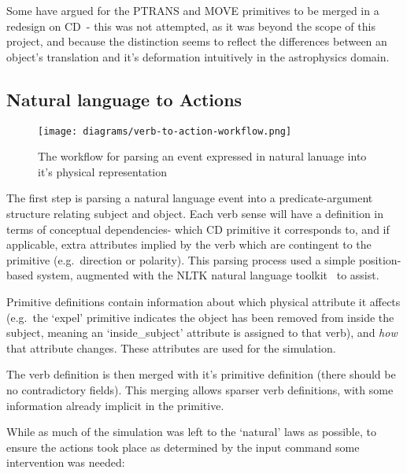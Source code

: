 \documentclass[dissertation.tex]{subfiles}
\begin{document}
    Some have argued for the PTRANS and MOVE primitives to be merged in a redesign on CD~\cite{macbethimage}- this was not attempted, as it was beyond the scope of this project, and because the distinction seems to reflect the differences between an object's translation and it's deformation intuitively in the astrophysics domain.

    \subsection{Natural language to Actions}

    \begin{figure}[h]
        \begin{center}
            \texttt{[image: diagrams/verb-to-action-workflow.png]}
        \end{center}
        \caption{The workflow for parsing an event expressed in natural lanuage into it's physical representation}
    \end{figure}

    The first step is parsing a natural language event into a predicate-argument structure relating subject and object. Each verb sense will have a definition in terms of conceptual dependencies- which CD primitive it corresponds to, and if applicable, extra attributes implied by the verb which are contingent to the primitive (e.g.~direction or polarity). This parsing process used a simple position-based system, augmented with the NLTK natural language toolkit~\cite{bird2009nltk} to assist.
    
    Primitive definitions contain information about which physical attribute it affects (e.g.~the `expel' primitive indicates the object has been removed from inside the subject, meaning an `inside\_subject' attribute is assigned to that verb), and \emph{how} that attribute changes. These attributes are used for the simulation.
    
    The verb definition is then merged with it's primitive definition (there should be no contradictory fields). This merging allows sparser verb definitions, with some information already implicit in the primitive.

    While as much of the simulation was left to the `natural' laws as possible, to ensure the actions took place as determined by the input command some intervention was needed:
\end{document}
